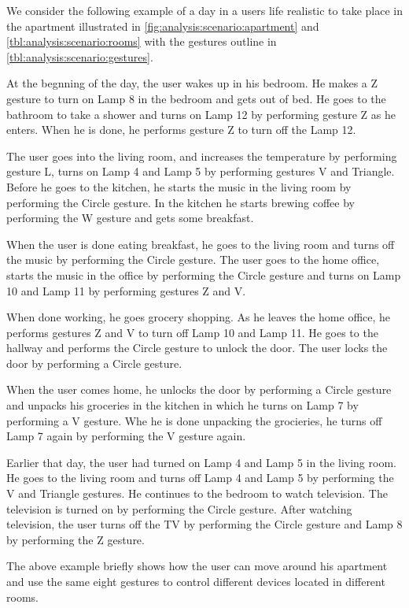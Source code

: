 We consider the following example of a day in a users life realistic to take place in the apartment illustrated in \cref{fig:analysis:scenario:apartment} and \cref{tbl:analysis:scenario:rooms} with the gestures outline in \cref{tbl:analysis:scenario:gestures}.

\begin{testexample}
At the begnning of the day, the user wakes up in his bedroom. He makes a Z gesture to turn on Lamp 8 in the bedroom and gets out of bed. He goes to the bathroom to take a shower and turns on Lamp 12 by performing gesture Z as he enters. When he is done, he performs gesture Z to turn off the Lamp 12.

The user goes into the living room, and increases the temperature by performing gesture L, turns on Lamp 4 and Lamp 5 by performing gestures V and Triangle. Before he goes to the kitchen, he starts the music in the living room by performing the Circle gesture. In the kitchen he starts brewing coffee by performing the W gesture and gets some breakfast.

When the user is done eating breakfast, he goes to the living room and turns off the music by performing the Circle gesture. The user goes to the home office, starts the music in the office by performing the Circle gesture and turns on Lamp 10 and Lamp 11 by performing gestures Z and V.

When done working, he goes grocery shopping. As he leaves the home office, he performs gestures Z and V to turn off Lamp 10 and Lamp 11. He goes to the hallway and performs the Circle gesture to unlock the door. The user locks the door by performing a Circle gesture.

When the user comes home, he unlocks the door by performing a Circle gesture and unpacks his groceries in the kitchen in which he turns on Lamp 7 by performing a V gesture. Whe he is done unpacking the grocieries, he turns off Lamp 7 again by performing the V gesture again.

Earlier that day, the user had turned on Lamp 4 and Lamp 5 in the living room. He goes to the living room and turns off Lamp 4 and Lamp 5 by performing the V and Triangle gestures. He continues to the bedroom to watch television. The television is turned on by performing the Circle gesture. After watching television, the user turns off the TV by performing the Circle gesture and Lamp 8 by performing the Z gesture.
\end{testexample}

The above example briefly shows how the user can move around his apartment and use the same eight gestures to control different devices located in different rooms.

